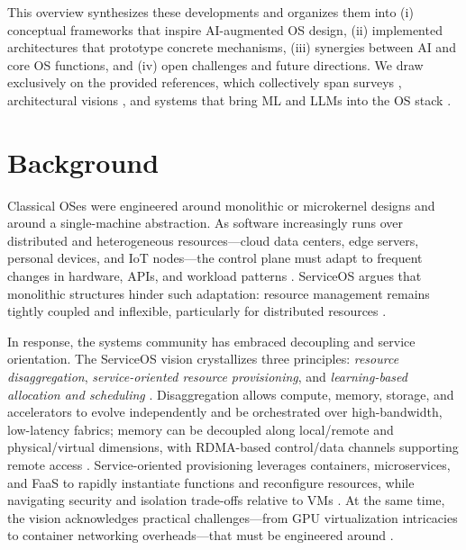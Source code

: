 \documentclass{article}
\begin{document}
This overview synthesizes these developments and organizes them into (i) conceptual frameworks that inspire AI-augmented OS design, (ii) implemented architectures that prototype concrete mechanisms, (iii) synergies between AI and core OS functions, and (iv) open challenges and future directions. We draw exclusively on the provided references, which collectively span surveys \cite{zhang2024systematic}, architectural visions \cite{liu2021serviceos}, and systems that bring ML and LLMs into the OS stack \cite{kamath2024llamas,he2024peros,packer2023memgpt,hao2020linnos,bateni2020neuos,goodarzy2021smartos}.

\section{Background}
Classical OSes were engineered around monolithic or microkernel designs and around a single-machine abstraction. As software increasingly runs over distributed and heterogeneous resources—cloud data centers, edge servers, personal devices, and IoT nodes—the control plane must adapt to frequent changes in hardware, APIs, and workload patterns \cite{liu2021serviceos}. %
ServiceOS argues that monolithic structures hinder such adaptation: resource management remains tightly coupled and inflexible, particularly for distributed resources \cite{liu2021serviceos}. %

In response, the systems community has embraced decoupling and service orientation. The ServiceOS vision crystallizes three principles: \emph{resource disaggregation}, \emph{service-oriented resource provisioning}, and \emph{learning-based allocation and scheduling} \cite{liu2021serviceos}. %
Disaggregation allows compute, memory, storage, and accelerators to evolve independently and be orchestrated over high-bandwidth, low-latency fabrics; memory can be decoupled along local/remote and physical/virtual dimensions, with RDMA-based control/data channels supporting remote access \cite{liu2021serviceos}. %
Service-oriented provisioning leverages containers, microservices, and FaaS to rapidly instantiate functions and reconfigure resources, while navigating security and isolation trade-offs relative to VMs \cite{liu2021serviceos}. %
At the same time, the vision acknowledges practical challenges—from GPU virtualization intricacies to container networking overheads—that must be engineered around \cite{liu2021serviceos}. %
\end{document}

